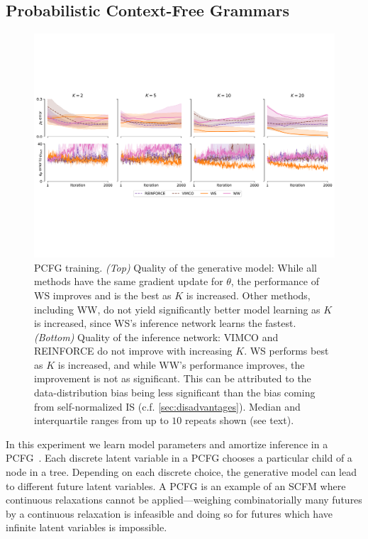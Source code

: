 \subsection{Probabilistic Context-Free Grammars}
\label{sec:experiments/pcfg}

\begin{figure}
  \centering
  \includegraphics[width=\textwidth]{figures/RRWS/pcfg/errors_vector.pdf}
  \vspace*{-0.7\baselineskip}
  \caption{
    \Gls{PCFG} training.
    \emph{(Top)}
    Quality of the generative model:
    While all methods have the same gradient update for $\theta$, the performance of \gls{WS} improves and is the best as $K$ is increased.
    Other methods, including \gls{WW}, do not yield significantly better model learning as $K$ is increased, since \gls{WS}'s inference network learns the fastest.
    \emph{(Bottom)}
    Quality of the inference network:
    \Gls{VIMCO} and \acrshort{REINFORCE} do not improve with increasing $K$.
    \Gls{WS} performs best as $K$ is increased, and while \gls{WW}'s performance improves, the improvement is not as significant.
    This can be attributed to the data-distribution bias being less significant than the bias coming from self-normalized \gls{IS} (c.f. \cref{sec:disadvantages}).
    Median and interquartile ranges from up to $10$ repeats shown (see text).
  }
  \label{fig:experiments/pcfg/astronomers_errors}
  \vspace*{-2ex}
\end{figure}


In this experiment we learn model parameters and amortize inference in a \gls{PCFG}~\citep{Booth1973applying}.
Each discrete latent variable in a \gls{PCFG} chooses a particular child of a node in a tree.
Depending on each discrete choice, the generative model can lead to different future latent variables.
A \gls{PCFG} is an example of an \gls{SCFM} where continuous relaxations cannot be applied---weighing combinatorially many futures by a continuous relaxation is infeasible and doing so for futures which have infinite latent variables is impossible.

